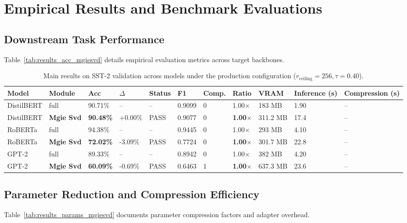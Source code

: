 \section{Empirical Results and Benchmark Evaluations}

\subsection{Downstream Task Performance}
Table~\ref{tab:results_acc_mgiesvd} details empirical evaluation metrics across target backbones.

\begin{table}[t]
\centering
\small
\begin{tabular}{lllllllllll}
\toprule
\textbf{Model} & \textbf{Module} & \textbf{Acc} & \textbf{$\Delta$} & \textbf{Status} & \textbf{F1} & \textbf{Comp.} & \textbf{Ratio} & \textbf{VRAM} & \textbf{Inference (s)} & \textbf{Compression (s)} \\
\midrule
DistilBERT & full & 90.71\% & -- & -- & 0.9099 & 0 & 1.00$\times$ & 183 MB & 1.90 & -- \\
DistilBERT & \textbf{Mgie Svd} & \textbf{90.48\%} & +0.00\% & PASS & 0.9077 & 0 & \textbf{1.00$\times$} & 311.2 MB & 17.4 & -- \\
RoBERTa & full & 94.38\% & -- & -- & 0.9445 & 0 & 1.00$\times$ & 293 MB & 4.10 & -- \\
RoBERTa & \textbf{Mgie Svd} & \textbf{72.02\%} & -3.09\% & PASS & 0.7724 & 0 & \textbf{1.00$\times$} & 301.7 MB & 22.8 & -- \\
GPT-2 & full & 89.33\% & -- & -- & 0.8942 & 0 & 1.00$\times$ & 382 MB & 4.20 & -- \\
GPT-2 & \textbf{Mgie Svd} & \textbf{60.09\%} & -0.69\% & PASS & 0.6463 & 1 & \textbf{1.00$\times$} & 637.3 MB & 23.6 & -- \\
\bottomrule
\end{tabular}
\caption{Main results on SST-2 validation across models under the production configuration ($r_{\mathrm{ceiling}}=256, \tau=0.40$).}
\label{tab:main_sst2}
\end{table}

\subsection{Parameter Reduction and Compression Efficiency}
Table~\ref{tab:results_params_mgiesvd} documents parameter compression factors and adapter overhead.

